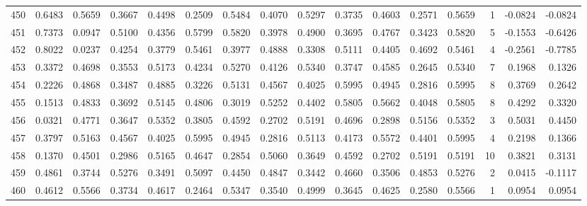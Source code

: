 \begin{tabular}{lrrrrrrrrrrrrrrr}
450 &      0.6483 &  0.5659 &  0.3667 &  0.4498 &  0.2509 &  0.5484 &  0.4070 &  0.5297 &  0.3735 &  0.4603 &   0.2571 &     0.5659 &      1 &                   -0.0824 &                    -0.0824 \\
451 &      0.7373 &  0.0947 &  0.5100 &  0.4356 &  0.5799 &  0.5820 &  0.3978 &  0.4900 &  0.3695 &  0.4767 &   0.3423 &     0.5820 &      5 &                   -0.1553 &                    -0.6426 \\
452 &      0.8022 &  0.0237 &  0.4254 &  0.3779 &  0.5461 &  0.3977 &  0.4888 &  0.3308 &  0.5111 &  0.4405 &   0.4692 &     0.5461 &      4 &                   -0.2561 &                    -0.7785 \\
453 &      0.3372 &  0.4698 &  0.3553 &  0.5173 &  0.4234 &  0.5270 &  0.4126 &  0.5340 &  0.3747 &  0.4585 &   0.2645 &     0.5340 &      7 &                    0.1968 &                     0.1326 \\
454 &      0.2226 &  0.4868 &  0.3487 &  0.4885 &  0.3226 &  0.5131 &  0.4567 &  0.4025 &  0.5995 &  0.4945 &   0.2816 &     0.5995 &      8 &                    0.3769 &                     0.2642 \\
455 &      0.1513 &  0.4833 &  0.3692 &  0.5145 &  0.4806 &  0.3019 &  0.5252 &  0.4402 &  0.5805 &  0.5662 &   0.4048 &     0.5805 &      8 &                    0.4292 &                     0.3320 \\
456 &      0.0321 &  0.4771 &  0.3647 &  0.5352 &  0.3805 &  0.4592 &  0.2702 &  0.5191 &  0.4696 &  0.2898 &   0.5156 &     0.5352 &      3 &                    0.5031 &                     0.4450 \\
457 &      0.3797 &  0.5163 &  0.4567 &  0.4025 &  0.5995 &  0.4945 &  0.2816 &  0.5113 &  0.4173 &  0.5572 &   0.4401 &     0.5995 &      4 &                    0.2198 &                     0.1366 \\
458 &      0.1370 &  0.4501 &  0.2986 &  0.5165 &  0.4647 &  0.2854 &  0.5060 &  0.3649 &  0.4592 &  0.2702 &   0.5191 &     0.5191 &     10 &                    0.3821 &                     0.3131 \\
459 &      0.4861 &  0.3744 &  0.5276 &  0.3491 &  0.5097 &  0.4450 &  0.4847 &  0.3442 &  0.4660 &  0.3506 &   0.4853 &     0.5276 &      2 &                    0.0415 &                    -0.1117 \\
460 &      0.4612 &  0.5566 &  0.3734 &  0.4617 &  0.2464 &  0.5347 &  0.3540 &  0.4999 &  0.3645 &  0.4625 &   0.2580 &     0.5566 &      1 &                    0.0954 &                     0.0954 \\

\end{tabular}
